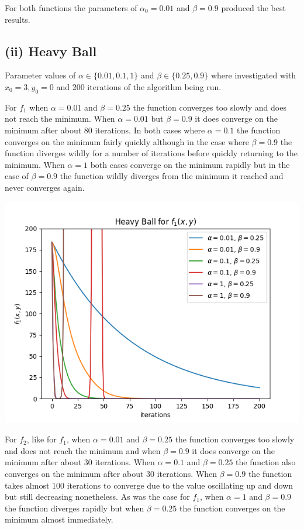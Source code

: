 \documentclass[12pt]{article}
\begin{document}
For both functions the parameters of $\alpha_0=0.01$ and $\beta=0.9$ produced the best results.

\subsection*{(ii) Heavy Ball}

Parameter values of $\alpha \in \{0.01, 0.1, 1\}$ and $\beta \in \{0.25, 0.9\}$ where investigated with $x_0 = 3, y_0 = 0$ and 200 iterations of the algorithm being run.

For $f_1$ when $\alpha=0.01$ and $\beta=0.25$ the function converges too slowly and does not reach the minimum. When $\alpha=0.01$ but $\beta=0.9$ it does converge on the minimum after about 80 iterations. In both cases where $\alpha=0.1$ the function converges on the minimum fairly quickly although in the case where $\beta=0.9$ the function diverges wildly for a number of iterations before quickly returning to the minimum. When $\alpha=1$ both cases converge on the minimum rapidly but in the case of $\beta=0.9$ the function wildly diverges from the minimum it reached and never converges again.

\begin{center}
    \includegraphics[scale=0.6]{figs/b/b_ii_1.png}
\end{center}

For $f_2$, like for $f_1$, when $\alpha=0.01$ and $\beta=0.25$ the function converges too slowly and does not reach the minimum and when $\beta=0.9$ it does converge on the minimum after about 30 iterations. When $\alpha=0.1$ and $\beta=0.25$ the function also converges on the minimum after about 30 iterations. When $\beta=0.9$ the function takes almost 100 iterations to converge due to the value oscillating up and down but still decreasing nonetheless. As was the case for $f_1$, when $\alpha=1$ and $\beta=0.9$ the function diverges rapidly but when $\beta=0.25$ the function converges on the minimum almost immediately.
\end{document}
